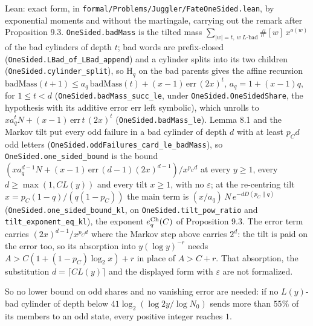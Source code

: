 \documentclass[11pt,a4paper]{article}
\begin{document}
Lean: exact form, in
\texttt{\nolinkurl{formal/Problems/Juggler/FateOneSided.lean}}, by
exponential moments and without the martingale, carrying out the remark
after Proposition 9.3. \texttt{\nolinkurl{OneSided.badMass}} is the
tilted mass \(\sum_{|w|=t,\ w\ L\text{-bad}}\#[w]\,x^{o(w)}\) of the bad
cylinders of depth \(t\); bad words are prefix-closed
(\texttt{\nolinkurl{OneSided.LBad_of_LBad_append}}) and a cylinder
splits into its two children
(\texttt{\nolinkurl{OneSided.cylinder_split}}), so \(\mathrm H_q\) on
the bad parents gives the affine recursion
\(\mathrm{badMass}(t+1)\le a_q\,\mathrm{badMass}(t)+(x-1)\,\mathrm{err}\,(2x)^t\),
\(a_q=1+(x-1)q\), for \(1\le t<d\)
(\texttt{\nolinkurl{OneSided.badMass_succ_le}}, under
\texttt{\nolinkurl{OneSided.OneSidedShare}}, the hypothesis with its
additive error \(\mathrm{err}\) left symbolic), which unrolls to
\(xa_q^{t}N+(x-1)\,\mathrm{err}\,t\,(2x)^t\)
(\texttt{\nolinkurl{OneSided.badMass_le}}). Lemma 8.1 and the Markov
tilt put every odd failure in a bad cylinder of depth \(d\) with at
least \(p_Cd\) odd letters
(\texttt{\nolinkurl{OneSided.oddFailures_card_le_badMass}}), so
\texttt{\nolinkurl{OneSided.one_sided_bound}} is the bound
\((xa_q^{d-1}N+(x-1)\,\mathrm{err}\,(d-1)(2x)^{d-1})/x^{p_Cd}\) at every
\(y\ge1\), every \(d\ge\max(1,CL(y))\) and every tilt \(x\ge1\), with no
\(\varepsilon\); at the re-centring tilt \(x=p_C(1-q)/(q(1-p_C))\) the
main term is \((x/a_q)\,N\,e^{-dD(p_C\|q)}\)
(\texttt{\nolinkurl{OneSided.one_sided_bound_kl}}, on
\texttt{\nolinkurl{OneSided.tilt_pow_ratio}} and
\texttt{\nolinkurl{tilt_exponent_eq_kl}}), the exponent
\(e^{\rm Ch}_q(C)\) of Proposition 9.3. The error term carries
\((2x)^{d-1}/x^{p_Cd}\) where the Markov step above carries \(2^d\): the
tilt is paid on the error too, so its absorption into \(y(\log y)^{-r}\)
needs \(A>C(1+(1-p_C)\log_2x)+r\) in place of \(A>C+r\). That
absorption, the substitution \(d=\lceil CL(y)\rceil\) and the displayed
form with \(\varepsilon\) are not formalized.

So no lower bound on odd shares and no vanishing error are needed: if no
\(L(y)\)-bad cylinder of depth below \(41\log_2(\log 2y/\log N_0)\)
sends more than \(55\%\) of its members to an odd state, every positive
integer reaches \(1\).
\end{document}
